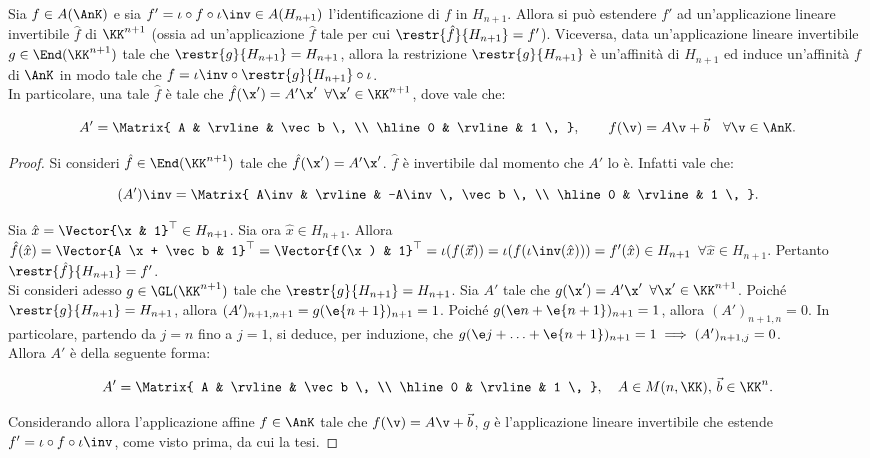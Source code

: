 \documentclass[11pt]{article}
\begin{document}
	\begin{proposition}
		Sia $f \in A(\AnK)$ e sia $f' = \iota \circ f \circ \iota\inv \in A(H_{n+1})$
		l'identificazione di $f$ in $H_{n+1}$. Allora si può estendere $f'$ ad un'applicazione lineare invertibile $\hat f$ di $\KK^{n+1}$ (ossia ad un'applicazione $\hat f$ tale per cui $\restr{\hat f}{H_{n+1}} = f'$). Viceversa, data un'applicazione lineare invertibile $g \in \End(\KK^{n+1})$ tale che $\restr{g}{H_{n+1}} = H_{n+1}$, allora la restrizione $\restr{g}{H_{n+1}}$ è un'affinità di $H_{n+1}$ ed
		induce un'affinità $f$ di $\AnK$ in modo tale che $f = \iota\inv \circ \restr{g}{H_{n+1}} \circ \iota$. \\
		
		In particolare, una tale $\hat f$ è tale che $\hat f(\x') = A' \x'$ $\forall \x' \in \KK^{n+1}$, dove
		vale che:
		
		\[ A' = \Matrix{ A & \rvline & \vec b \, \\ \hline 0 & \rvline & 1 \, }, \qquad f(\v) = A \v + \vec b \quad \forall \v \in \AnK. \]
	\end{proposition}
	
	\begin{proof}
		Si consideri $\hat f \in \End(\KK^{n+1})$ tale che $\hat f(\x') = A' \x'$. $\hat f$ è invertibile dal
		momento che $A'$ lo è. Infatti vale che:
		
		\[ (A')\inv = \Matrix{ A\inv & \rvline & -A\inv \, \vec b \, \\ \hline 0 & \rvline & 1 \, }. \]
		
		\vskip 0.05in
		
		Sia $\hat x = \Vector{\x & 1}^\top \in H_{n+1}$. Sia ora $\hat x \in H_{n+1}$. Allora $\hat f(\hat x) = \Vector{A \x + \vec b & 1}^\top = \Vector{f(\x) & 1}^\top = \iota(f(\vec x)) = \iota(f(\iota\inv(\hat x))) = f'(\hat x) \in H_{n+1}$ $\forall \hat x \in H_{n+1}$. Pertanto $\restr{\hat f}{H_{n+1}} = f'$. \\
		
		Si consideri adesso $g \in \GL(\KK^{n+1})$ tale che $\restr{g}{H_{n+1}} = H_{n+1}$. Sia $A'$ tale che
		$g(\x') = A' \x'$ $\forall \x' \in \KK^{n+1}$. Poiché $\restr{g}{H_{n+1}} = H_{n+1}$, allora
		$(A')_{n+1,n+1} = g(\e{n+1})_{n+1} = 1$. Poiché $g(\e n + \e{n+1})_{n+1} = 1$, allora $(A')_{n+1,n} = 0$.
		In particolare, partendo da $j=n$ fino a $j=1$, si deduce, per induzione, che $g(\e j + \ldots + \e{n+1})_{n+1} = 1 \implies (A')_{n+1,j} = 0$. \\
		
		Allora $A'$ è della seguente forma:
		
		\[ A' = \Matrix{ A & \rvline & \vec b \, \\ \hline 0 & \rvline & 1 \, }, \quad A \in M(n, \KK), \, \vec b \in \KK^n. \]
		
		\vskip 0.05in
		
		Considerando allora l'applicazione affine $f \in \AnK$ tale che $f(\v) = A \v + \vec b$,
		$g$ è l'applicazione lineare invertibile che estende $f' = \iota \circ f \circ \iota\inv$, come
		visto prima, da cui la tesi.
	\end{proof}
	
\end{document}
